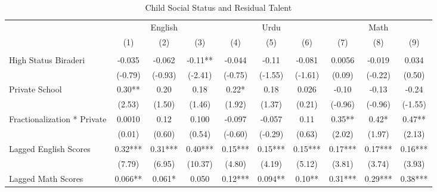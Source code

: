 \begin{sidewaystable}[htbp]\centering
\def\sym#1{\ifmmode^{#1}\else\(^{#1}\)\fi}
\caption{Child Social Status and Residual Talent\label{castesarentdumb}}
\begin{tabular}{l*{9}{c}}
\toprule
                &\multicolumn{3}{c}{English}           &\multicolumn{3}{c}{Urdu}              &\multicolumn{3}{c}{Math}              \\\cmidrule(lr){2-4}\cmidrule(lr){5-7}\cmidrule(lr){8-10}
                &\multicolumn{1}{c}{(1)}&\multicolumn{1}{c}{(2)}&\multicolumn{1}{c}{(3)}&\multicolumn{1}{c}{(4)}&\multicolumn{1}{c}{(5)}&\multicolumn{1}{c}{(6)}&\multicolumn{1}{c}{(7)}&\multicolumn{1}{c}{(8)}&\multicolumn{1}{c}{(9)}\\
                &\multicolumn{1}{c}{}&\multicolumn{1}{c}{}&\multicolumn{1}{c}{}&\multicolumn{1}{c}{}&\multicolumn{1}{c}{}&\multicolumn{1}{c}{}&\multicolumn{1}{c}{}&\multicolumn{1}{c}{}&\multicolumn{1}{c}{}\\
\midrule
High Status Biraderi&   -0.035   &   -0.062   &    -0.11** &   -0.044   &    -0.11   &   -0.081   &   0.0056   &   -0.019   &    0.034   \\
                &  (-0.79)   &  (-0.93)   &  (-2.41)   &  (-0.75)   &  (-1.55)   &  (-1.61)   &   (0.09)   &  (-0.22)   &   (0.50)   \\
Private School  &     0.30** &     0.20   &     0.18   &     0.22*  &     0.18   &    0.026   &    -0.10   &    -0.13   &    -0.24   \\
                &   (2.53)   &   (1.50)   &   (1.46)   &   (1.92)   &   (1.37)   &   (0.21)   &  (-0.96)   &  (-0.96)   &  (-1.55)   \\
Fractionalization * Private&   0.0010   &     0.12   &    0.100   &   -0.097   &   -0.057   &     0.11   &     0.35** &     0.42*  &     0.47** \\
                &   (0.01)   &   (0.60)   &   (0.54)   &  (-0.60)   &  (-0.29)   &   (0.63)   &   (2.02)   &   (1.97)   &   (2.13)   \\
Lagged English Scores&     0.32***&     0.31***&     0.40***&     0.15***&     0.15***&     0.15***&     0.17***&     0.17***&     0.16***\\
                &   (7.79)   &   (6.95)   &  (10.37)   &   (4.80)   &   (4.19)   &   (5.12)   &   (3.81)   &   (3.74)   &   (3.93)   \\
Lagged Math Scores&    0.066** &    0.061*  &    0.050   &     0.12***&    0.094** &     0.10** &     0.31***&     0.29***&     0.38***\\

\end{tabular}
\end{sidewaystable}
